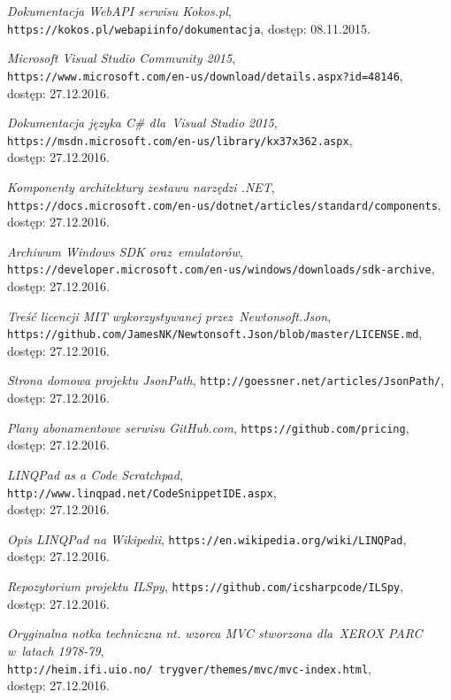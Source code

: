 \documentclass[a4paper,twoside,titlepage,openright]{book}
\begin{document}
\begin{thebibliography}{99}
 \textit{Dokumentacja WebAPI serwisu Kokos.pl}, 
\texttt{https://kokos.pl/webapiinfo/dokumentacja}, dostęp: 08.11.2015.

 \textit{Microsoft Visual Studio Community 2015}, \\
\texttt{https://www.microsoft.com/en-us/download/details.aspx?id=48146}, \\dostęp: 27.12.2016.

 \textit{Dokumentacja języka C\# dla~Visual Studio 2015}, \\
\texttt{https://msdn.microsoft.com/en-us/library/kx37x362.aspx}, \\dostęp: 27.12.2016.

 \textit{Komponenty architektury zestawu narzędzi .NET}, \\
\texttt{https://docs.microsoft.com/en-us/dotnet/articles/standard/components},\\ dostęp: 27.12.2016.

 \textit{Archiwum Windows SDK oraz~emulatorów}, \\
\texttt{https://developer.microsoft.com/en-us/windows/downloads/sdk-archive}, \\dostęp: 27.12.2016.

 \textit{Treść licencji MIT wykorzystywanej przez~Newtonsoft.Json}, \\
\texttt{https://github.com/JamesNK/Newtonsoft.Json/blob/master/LICENSE.md}, \\dostęp: 27.12.2016.

 \textit{Strona domowa projektu JsonPath}, 
\texttt{http://goessner.net/articles/JsonPath/}, \\dostęp: 27.12.2016.

 \textit{Plany abonamentowe serwisu GitHub.com}, 
\texttt{https://github.com/pricing}, \\dostęp: 27.12.2016.

 \textit{LINQPad as a Code Scratchpad}, 
\texttt{http://www.linqpad.net/CodeSnippetIDE.aspx}, \\dostęp: 27.12.2016.

 \textit{Opis LINQPad na Wikipedii}, 
\texttt{https://en.wikipedia.org/wiki/LINQPad}, \\dostęp: 27.12.2016.

 \textit{Repozytorium projektu ILSpy}, 
\texttt{https://github.com/icsharpcode/ILSpy}, \\dostęp: 27.12.2016.

 \textit{Oryginalna notka techniczna nt. wzorca MVC stworzona dla~XEROX PARC w~latach 1978-79}, \\
\texttt{http://heim.ifi.uio.no/~trygver/themes/mvc/mvc-index.html}, \\dostęp: 27.12.2016.



\end{thebibliography}
\end{document}
